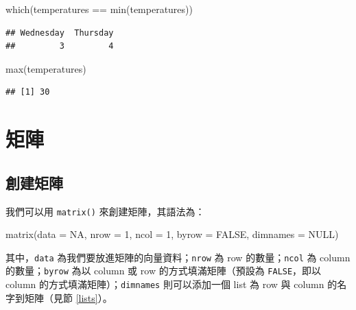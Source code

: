 \documentclass[
]{book}
\newenvironment{Shaded}{\begin{snugshade}}{\end{snugshade}}
\newcommand{\AttributeTok}[1]{\textcolor[rgb]{0.77,0.63,0.00}{#1}}
\newcommand{\ConstantTok}[1]{\textcolor[rgb]{0.00,0.00,0.00}{#1}}
\newcommand{\DecValTok}[1]{\textcolor[rgb]{0.00,0.00,0.81}{#1}}
\newcommand{\FunctionTok}[1]{\textcolor[rgb]{0.00,0.00,0.00}{#1}}
\newcommand{\NormalTok}[1]{#1}
\newcommand{\SpecialCharTok}[1]{\textcolor[rgb]{0.00,0.00,0.00}{#1}}
\theoremstyle{definition}
\theoremstyle{remark}
\begin{document}
\begin{Shaded}
\begin{Highlighting}[]
\FunctionTok{which}\NormalTok{(temperatures }\SpecialCharTok{==} \FunctionTok{min}\NormalTok{(temperatures))}
\end{Highlighting}
\end{Shaded}

\begin{verbatim}
## Wednesday  Thursday 
##         3         4
\end{verbatim}

\begin{Shaded}
\begin{Highlighting}[]
\FunctionTok{max}\NormalTok{(temperatures)}
\end{Highlighting}
\end{Shaded}

\begin{verbatim}
## [1] 30
\end{verbatim}

\hypertarget{ux77e9ux9663}{%
\section{矩陣}\label{ux77e9ux9663}}

\hypertarget{ux5275ux5efaux77e9ux9663}{%
\subsection{創建矩陣}\label{ux5275ux5efaux77e9ux9663}}

我們可以用 \texttt{matrix()} 來創建矩陣，其語法為：

\begin{Shaded}
\begin{Highlighting}[]
\FunctionTok{matrix}\NormalTok{(}\AttributeTok{data =} \ConstantTok{NA}\NormalTok{, }\AttributeTok{nrow =} \DecValTok{1}\NormalTok{, }\AttributeTok{ncol =} \DecValTok{1}\NormalTok{, }\AttributeTok{byrow =} \ConstantTok{FALSE}\NormalTok{, }\AttributeTok{dimnames =} \ConstantTok{NULL}\NormalTok{)}
\end{Highlighting}
\end{Shaded}

其中，\texttt{data} 為我們要放進矩陣的向量資料；\texttt{nrow} 為 row 的數量；\texttt{ncol} 為 column 的數量；\texttt{byrow} 為以 column 或 row 的方式填滿矩陣（預設為 \texttt{FALSE}，即以 column 的方式填滿矩陣）；\texttt{dimnames} 則可以添加一個 list 為 row 與 column 的名字到矩陣（見節 \ref{lists}）。
\end{document}
